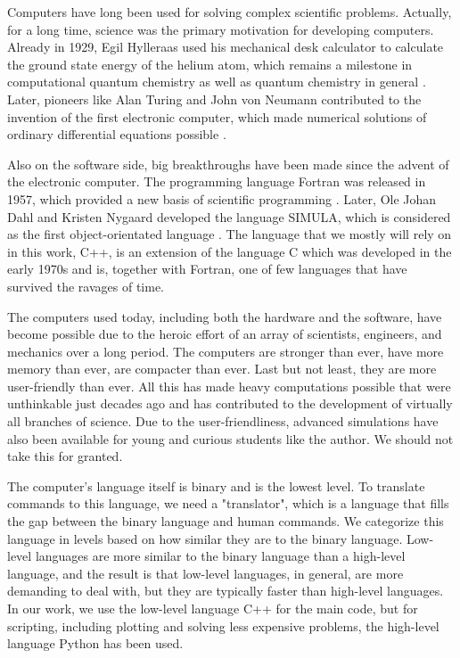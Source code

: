Computers have long been used for solving complex scientific problems. Actually, for a long time, science was the primary motivation for developing computers. Already in 1929, Egil Hylleraas used his mechanical desk calculator to calculate the ground state energy of the helium atom, which remains a milestone in computational quantum chemistry as well as quantum chemistry in general \supercite{helgaker_perspective_2000}. Later, pioneers like Alan Turing and John von Neumann contributed to the invention of the first electronic computer, which made numerical solutions of ordinary differential equations possible \supercite{gustafsson_scientific_2018}. 

Also on the software side, big breakthroughs have been made since the advent of the electronic computer. The programming language Fortran was released in 1957, which provided a new basis of scientific programming \supercite{allen_history_1981}. Later, Ole Johan Dahl and Kristen Nygaard developed the language SIMULA, which is considered as the first object-orientated language \supercite{holmevik_compiling_1994}. The language that we mostly will rely on in this work, C++, is an extension of the language C which was developed in the early 1970s and is, together with Fortran, one of few languages that have survived the ravages of time. 

The computers used today, including both the hardware and the software, have become possible due to the heroic effort of an array of scientists, engineers, and mechanics over a long period. The computers are stronger than ever, have more memory than ever, are compacter than ever. Last but not least, they are more user-friendly than ever. All this has made heavy computations possible that were unthinkable just decades ago and has contributed to the development of virtually all branches of science. Due to the user-friendliness, advanced simulations have also been available for young and curious students like the author. We should not take this for granted. 

The computer's language itself is binary and is the lowest level. To translate commands to this language, we need a "translator", which is a language that fills the gap between the binary language and human commands. We categorize this language in levels based on how similar they are to the binary language. Low-level languages are more similar to the binary language than a high-level language, and the result is that low-level languages, in general, are more demanding to deal with, but they are typically faster than high-level languages. In our work, we use the low-level language C++ for the main code, but for scripting, including plotting and solving less expensive problems, the high-level language Python has been used. 

